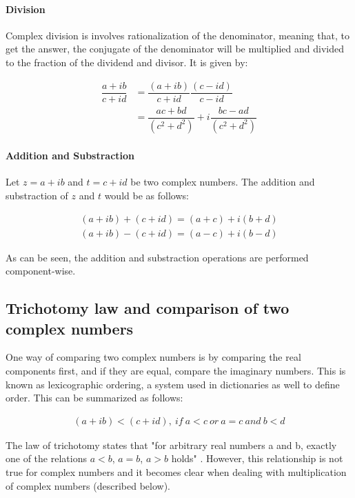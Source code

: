 \paragraph{Division}
Complex division is involves rationalization of the denominator, meaning that, to get the answer, the conjugate of the denominator will be multiplied and divided to the fraction of the dividend and divisor. It is given by:

\begin{equation}
\begin{aligned}
\dfrac{a+ib}{c+id} &= \dfrac{(a+ib)}{c+id}\dfrac{(c-id)}{c-id}\\
&= \dfrac{ac+bd}{(c^2+d^2)}+i\dfrac{bc-ad}{(c^2+d^2)}
\end{aligned}
\end{equation}

\paragraph{Addition and Substraction}
Let $z = a+ib$ and $t=c+id$ be two complex numbers. The addition and substraction of $z$ and $t$ would be as follows:

\begin{equation}
\begin{aligned}
(a+ib) + (c+id)  = (a+c)+i(b+d)\\
(a+ib) - (c+id)  = (a-c)+i(b-d)
\end{aligned}
\end{equation}

As can be seen, the addition and substraction operations are performed 
component-wise.

\subsection{Trichotomy law and comparison of two complex numbers}
One way of comparing two complex numbers is by comparing the real components first, and if they are equal, compare the imaginary numbers. This is known as lexicographic ordering, a system used in dictionaries as well to define order. This can be summarized as follows:

\begin{equation}
\begin{aligned}
(a+ib) < (c+id), \ if \ a<c \ or \ a=c \ and \ b<d
\end{aligned}
\end{equation}

The law of trichotomy states that "for arbitrary real numbers a and b, exactly one of the relations $a<b$, $a=b$, $a>b$ holds" \cite{trichotomy}. However, this relationship is not true for complex numbers and it becomes clear when dealing with multiplication of complex numbers (described below).

